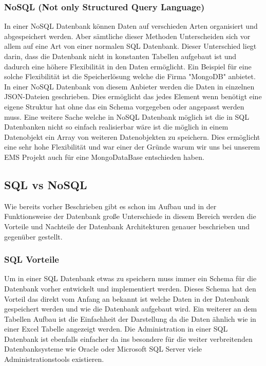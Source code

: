 \documentclass[12pt, letterpaper, twoside]{article}
\begin{document}
	\subsubsection{NoSQL (Not only Structured Query Language)}	
	In einer NoSQL Datenbank können Daten auf verschieden Arten organisiert und abgespeichert werden. Aber sämtliche dieser Methoden Unterscheiden sich vor allem auf eine Art von einer normalen SQL Datenbank. Dieser Unterschied liegt darin, dass die Datenbank nicht in konstanten Tabellen aufgebaut ist und dadurch eine höhere Flexibilität in den Daten ermöglicht. Ein Beispiel für eine solche Flexibilität ist die Speicherlösung welche die Firma "MongoDB" anbietet. In einer NoSQL Datenbank von diesem Anbieter werden die Daten in einzelnen JSON-Dateien geschrieben. Dies ermöglicht das jedes Element wenn benötigt eine eigene Struktur hat ohne das ein Schema vorgegeben oder angepasst werden muss. Eine weitere Sache welche in NoSQL Datenbank möglich ist die in SQL Datenbanken nicht so einfach realisierbar wäre ist die möglich in einem Datenobjekt ein Array von weiteren Datenobjekten zu speichern. Dies ermöglicht eine sehr hohe Flexibilität und war einer der Gründe warum wir uns bei unserem EMS Projekt auch für eine MongoDataBase entschieden haben.
	
	\subsection{SQL vs NoSQL}
		Wie bereits vorher Beschrieben gibt es schon im Aufbau und in der Funktionsweise der Datenbank große Unterschiede in diesem Bereich werden die Vorteile und Nachteile der Datenbank Architekturen genauer beschrieben und gegenüber gestellt.
	
	\subsubsection{SQL Vorteile}
		Um in einer SQL Datenbank etwas zu speichern muss immer ein Schema für die Datenbank vorher entwickelt und implementiert werden. Dieses Schema hat den Vorteil das direkt vom Anfang an bekannt ist welche Daten in der Datenbank gespeichert werden und wie die Datenbank aufgebaut wird. 
		Ein weiterer an dem Tabellen Aufbau ist die Einfachheit der Darstellung da die Daten ähnlich wie in einer Excel Tabelle angezeigt werden. Die Administration in einer SQL Datenbank ist ebenfalls einfacher da ins besondere für die weiter verbreitenden Datenbanksysteme wie Oracle oder Microsoft SQL Server viele Administrationstools existieren.
		
\end{document}
